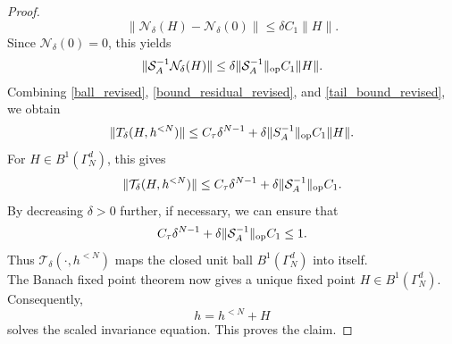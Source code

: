 \documentclass{amsart}
\theoremstyle{plain}
\theoremstyle{definition}
\begin{document}
\begin{proof}
\begin{equation}
        \|\mathcal N_\delta(H)-\mathcal N_\delta(0)\|
        \le
        \delta C_1\|H\|.
\end{equation}
Since $\mathcal N_\delta(0)=0$, this yields
\begin{equation}\label{tail_bound_revised}
        \|\mathcal S_A^{-1}\mathcal N_\delta(H)\|
        \le
        \delta
        \|\mathcal S_A^{-1}\|_{\rm op}
        C_1
        \|H\|.
\end{equation}
Combining \eqref{ball_revised}, \eqref{bound_residual_revised}, and
\eqref{tail_bound_revised}, we obtain
\begin{equation}
    \|T_\delta(H,h^{<N})\|
    \leq
    C_\tau\delta^{N-1}
    +
    \delta\|S_A^{-1}\|_{\rm op}C_1\|H\|.
\end{equation}
For $H\in B^1(\Gamma_N^d)$, this gives
\begin{equation}
        \|\mathcal T_\delta(H,h^{<N})\|
        \le
        C_{\tau}\delta^{N-1}
        +
        \delta
        \|\mathcal S_A^{-1}\|_{\rm op}
        C_1 .
\end{equation}
By decreasing $\delta>0$ further, if necessary, we can ensure that
\begin{equation}
        C_{\tau}\delta^{N-1}
        +
        \delta
        \|\mathcal S_A^{-1}\|_{\rm op}
        C_1
        \leq 1.
\end{equation}
Thus $\mathcal T_\delta(\cdot,h^{<N})$ maps the closed unit ball
$B^1(\Gamma_N^d)$ into itself.\\
The Banach fixed point theorem now gives a unique fixed point
$H\in B^1(\Gamma_N^d)$. Consequently,
\begin{equation}
        h=h^{<N}+H
\end{equation}
solves the scaled invariance equation. This proves the claim.
\end{proof}



\end{document}

